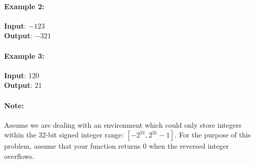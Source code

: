 \paragraph{Example 2:}
\begin{flushleft}
\textbf{Input}: $-123$
\\
\textbf{Output}: $-321$
\end{flushleft}
\paragraph{Example 3:}
\begin{flushleft}
\textbf{Input}: 120
\\
\textbf{Output}: 21
\end{flushleft}
\paragraph{Note:}
Assume we are dealing with an environment which could only store integers within the 32-bit signed integer range: $[-2^{31}, 2^{31}-1]$. For the purpose of this problem, assume that your function returns 0 when the reversed integer overflows.
